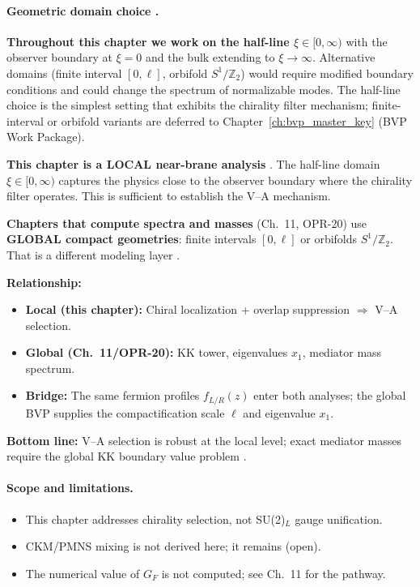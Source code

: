 \paragraph{Geometric domain choice \tagP{}.}
\textbf{Throughout this chapter we work on the half-line $\xi \in [0, \infty)$} with
the observer boundary at $\xi = 0$ and the bulk extending to $\xi \to \infty$.
Alternative domains (finite interval $[0, \ell]$, orbifold $S^1/\mathbb{Z}_2$)
would require modified boundary conditions and could change the spectrum of
normalizable modes. The half-line choice is the simplest setting that exhibits
the chirality filter mechanism; finite-interval or orbifold variants are
deferred to Chapter~\ref{ch:bvp_master_key} (BVP Work Package).

\begin{tcolorbox}[colback=blue!5!white, colframe=blue!50!black,
    title=\textbf{Local vs Global Geometry Map}]
\textbf{This chapter is a LOCAL near-brane analysis} \tagP{}. The half-line
domain $\xi \in [0, \infty)$ captures the physics close to the observer boundary
where the chirality filter operates. This is sufficient to establish the V--A
mechanism.

\textbf{Chapters that compute spectra and masses} (Ch.~11, OPR-20) use
\textbf{GLOBAL compact geometries}: finite intervals $[0, \ell]$ or orbifolds
$S^1/\mathbb{Z}_2$. That is a different modeling layer \tagDc{}.

\textbf{Relationship:}
\begin{itemize}[nosep]
    \item \textbf{Local (this chapter):} Chiral localization + overlap suppression
          $\Rightarrow$ V--A selection. \tagDc{}
    \item \textbf{Global (Ch.~11/OPR-20):} KK tower, eigenvalues $x_1$, mediator
          mass spectrum. \tagDc{}
    \item \textbf{Bridge:} The same fermion profiles $f_{L/R}(z)$ enter both
          analyses; the global BVP supplies the compactification scale $\ell$
          and eigenvalue $x_1$. \tagDc{}
\end{itemize}

\textbf{Bottom line:} V--A selection is robust at the local level; exact mediator
masses require the global KK boundary value problem \tagDc{}.
\end{tcolorbox}

\paragraph{Scope and limitations.}
\begin{itemize}[nosep]
    \item This chapter addresses chirality selection, not SU(2)$_L$ gauge unification.
    \item CKM/PMNS mixing is not derived here; it remains (open).
    \item The numerical value of $G_F$ is not computed; see Ch.~11 for the pathway.
\end{itemize}

